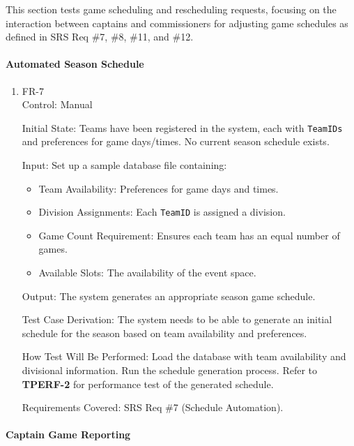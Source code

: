 \documentclass[12pt, titlepage]{article}
\begin{document}
This section tests game scheduling and rescheduling requests, focusing on the interaction between captains and commissioners for adjusting game schedules as defined in SRS Req \#7, \#8, \#11, and \#12.

\paragraph{Automated Season Schedule}

\begin{enumerate}

  \item{FR-7\\}
        Control: Manual

        Initial State: Teams have been registered in the system, each with \texttt{TeamIDs} and preferences for game days/times. No current season schedule exists.

        Input:
        Set up a sample database file containing:
        \begin{itemize}
          \item Team Availability: Preferences for game days and times.
          \item Division Assignments: Each \texttt{TeamID} is assigned a division.
          \item Game Count Requirement: Ensures each team has an equal number of games.
          \item Available Slots: The availability of the event space.
        \end{itemize}

        Output: The system generates an appropriate season game schedule.

        Test Case Derivation: The system needs to be able to generate an initial schedule for the season based on team availability and preferences.

        How Test Will Be Performed: Load the database with team availability and divisional information. Run the schedule generation process. Refer to \textbf{TPERF-2} for performance test of the generated schedule.

        Requirements Covered: SRS Req \#7 (Schedule Automation).

\end{enumerate}

\paragraph{Captain Game Reporting}
\end{document}
